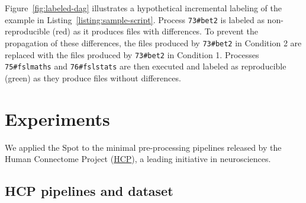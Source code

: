 \documentclass[a4paper,num-refs]{oup-contemporary}
\newcommand{\toolname}[0]{Spot\xspace}
\begin{document}
Figure~\ref{fig:labeled-dag} illustrates a hypothetical incremental
labeling of the example in Listing~\ref{listing:sample-script}. Process
\texttt{73\#bet2} is labeled as non-reproducible (red) as it produces files
with differences. To prevent the propagation of these differences, the
files produced by \texttt{73\#bet2} in Condition 2 are replaced with the
files produced by \texttt{73\#bet2} in Condition 1. Processes
\texttt{75\#fslmaths} and \texttt{76\#fslstats} are then executed and
labeled as reproducible (green) as they produce files without differences.

\section{Experiments}

We applied the \toolname to the minimal
pre-processing pipelines released by the Human Connectome Project
(\href{https://www.humanconnectome.org}{HCP}), a leading initiative in
neurosciences. 




\subsection{HCP pipelines and dataset}

\end{document}
